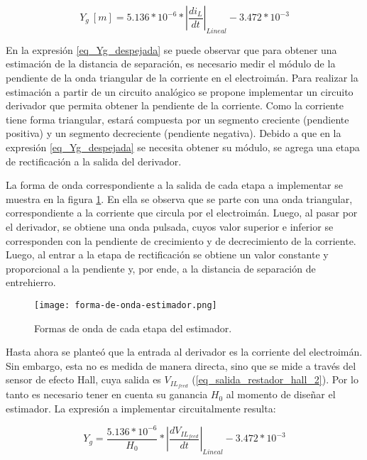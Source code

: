 \begin{equation} \label{eq_Yg_despejada}
	Y_g\:[m] =5.136*10^{-6}*{\left|\frac{di_L}{dt}\right|}_{Lineal} - 3.472*10^{-3}
\end{equation}


En la expresión \ref{eq_Yg_despejada} se puede observar que para obtener una estimación de la distancia de separación, es necesario medir el módulo de la pendiente de la onda triangular de la corriente en el electroimán. Para realizar la estimación a partir de un circuito analógico se propone implementar un circuito derivador que permita obtener la pendiente de la corriente. Como la corriente tiene forma triangular, estará compuesta por un segmento creciente (pendiente positiva) y un segmento decreciente (pendiente negativa). Debido a que en la expresión \ref{eq_Yg_despejada} se necesita obtener su módulo, se agrega una etapa de rectificación a la salida del derivador.

La forma de onda correspondiente a la salida de cada etapa a implementar se muestra en la figura \ref{fig:img_forma-de-onda-estimador}. En ella se observa que se parte con una onda triangular, correspondiente a la corriente que circula por el electroimán. Luego, al pasar por el derivador, se obtiene una onda pulsada, cuyos valor superior e inferior se corresponden con la pendiente de crecimiento y de decrecimiento de la corriente. Luego, al entrar a la etapa de rectificación se obtiene un valor constante y proporcional a la pendiente y, por ende, a la distancia de separación de entrehierro.


\begin{figure}[H]
	\centering
	\texttt{[image: forma-de-onda-estimador.png]}
	\caption{Formas de onda de cada etapa del estimador.}
	\label{fig:img_forma-de-onda-estimador}
\end{figure}



Hasta ahora se planteó que la entrada al derivador es la corriente del electroimán. Sin embargo, esta no es medida de manera directa, sino que se mide a través del sensor de efecto Hall, cuya salida es $V_{IL_{feed}}$ (\ref{eq_salida_restador_hall_2}). Por lo tanto es necesario tener en cuenta su ganancia $H_0$ al momento de diseñar el estimador. La expresión a implementar circuitalmente resulta:

\begin{equation} \label{eq_Yg_salida_sensor}
	Y_g=\frac{5.136*10^{-6}}{H_0}*{\left|\frac{dV_{IL_{feed}}}{dt}\right|}_{Lineal} - 3.472*10^{-3}
\end{equation}

